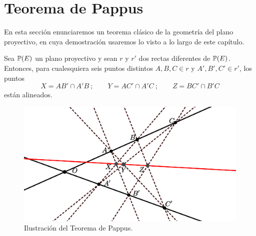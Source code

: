\section{Teorema de Pappus}
En esta sección enunciaremos un teorema clásico de la geometría del plano proyectivo, en cuya demostración usaremos lo visto a lo largo de este capítulo.
\begin{theo}
	Sea $\mathbb{P}(E)$ un plano proyectivo y sean $r$ y $r'$ dos rectas diferentes de $\mathbb{P}(E)$. Entonces, para cualesquiera seis puntos distintos $A,B,C\in r$ y $A',B',C'\in r'$, los puntos
	\begin{equation*}
		X=AB'\cap A'B \ ; \qquad Y=AC'\cap A'C \ ; \qquad Z=BC'\cap B'C
	\end{equation*}
	están alineados.
	\begin{figure}[h]
		\centering
		\includegraphics[scale=.5]{Graficos/Pappus.eps}
		\caption{Ilustración del Teorema de Pappus.}
		\label{C3_pappus}
	\end{figure}
\end{theo}

